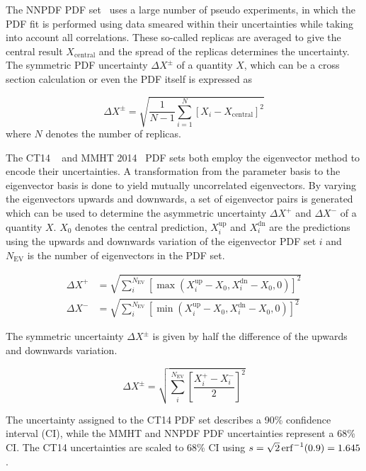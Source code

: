 The NNPDF PDF set~\cite{Ball:2014uwa} uses a large number of pseudo experiments,
in which the PDF fit is performed using data smeared within their uncertainties
while taking into account all correlations. These so-called replicas are
averaged to give the central result $X_\mathrm{central}$ and the spread of the
replicas determines the uncertainty. The symmetric PDF uncertainty $\Delta
X^\pm$ of a quantity $X$, which can be a cross section calculation or even the
PDF itself is expressed as

\begin{equation*}
    \Delta X^{\pm} = \sqrt{\frac{1}{N-1} \sum_{i=1}^N \left[ X_{i} - X_{\mathrm{central}} \right]^2}
\end{equation*}
where $N$ denotes the number of replicas.

The CT14 ~\cite{Dulat:2015mca} and MMHT 2014~\cite{Harland-Lang:2014zoa} PDF
sets both employ the eigenvector method to encode their uncertainties. A
transformation from the parameter basis to the eigenvector basis is done to
yield mutually uncorrelated eigenvectors. By varying the eigenvectors upwards
and downwards, a set of eigenvector pairs is generated which can be used to
determine the asymmetric uncertainty $\Delta X^+$ and $\Delta X^-$ of a quantity
$X$. $X_0$ denotes the central prediction, $X_i^{\mathrm{up}}$ and
$X_i^{\mathrm{dn}}$ are the predictions using the upwards and downwards
variation of the eigenvector PDF set $i$ and $N_{\mathrm{EV}}$ is the number of
eigenvectors in the PDF set.

\begin{equation*}
\begin{aligned}
    \Delta X^+ &= \sqrt{\sum_i^{N_{\mathrm{EV}}} \left[ \max(X_i^{\mathrm{up}}
    -X_0, X_i^{\mathrm{dn}} - X_0, 0)\right]^2}\\
\Delta X^- &= \sqrt{\sum_i^{N_{\mathrm{EV}}} \left[ \min(X_i^{\mathrm{up}} - X_0, X_i^{\mathrm{dn}} - X_0,0)\right]^2}
\end{aligned}
\end{equation*}

The symmetric uncertainty $\Delta X^{\pm}$ is given by half the difference of the upwards and
downwards variation.

\begin{equation*}
    \Delta X^{\pm} = \sqrt{\sum_i^{N_{\mathrm{EV}}} \left[ \frac{X_i^+ -
    X_i^-}{2} \right]^2}
\end{equation*}

The uncertainty assigned to the CT14 PDF set describes a 90\% confidence
interval (CI), while the MMHT and NNPDF PDF uncertainties represent a 68\% CI.
The CT14 uncertainties are scaled to 68\% CI using $s = \sqrt{2}
\operatorname{erf}^{-1}(0.9) = 1.645$.

